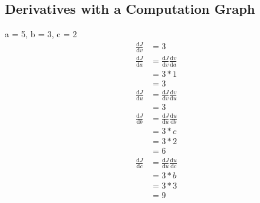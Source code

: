 \subsection{Derivatives with a Computation Graph}
a = 5, b = 3, c = 2
\begin{align}
	\frac{\mathrm{d}J}{\mathrm{d}v} &= 3 \\
	\frac{\mathrm{d}J}{\mathrm{d}a} &= \frac{\mathrm{d}J}{\mathrm{d}v} \frac{\mathrm{d}v}{\mathrm{d}a} \\
	&= 3 * 1 \\
	&= 3 \\
	\frac{\mathrm{d}J}{\mathrm{d}u} &= \frac{\mathrm{d}J}{\mathrm{d}v} \frac{\mathrm{d}v}{\mathrm{d}u} \\ 
	&= 3 \\
	\frac{\mathrm{d}J}{\mathrm{d}b} &= \frac{\mathrm{d}J}{\mathrm{d}u} \frac{\mathrm{d}u}{\mathrm{d}b} \\
	&= 3 * c \\
	&= 3 * 2 \\
	&= 6 \\
	\frac{\mathrm{d}J}{\mathrm{d}c} &= \frac{\mathrm{d}J}{\mathrm{d}u} \frac{\mathrm{d}u}{\mathrm{d}c} \\
	&= 3 * b \\
	&= 3 * 3 \\
	&= 9
\end{align}